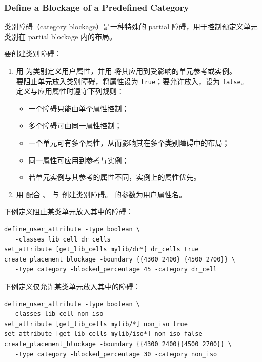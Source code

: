 \subsubsection*{Define a Blockage of a Predefined Category}

类别障碍（category blockage）是一种特殊的 partial 障碍，用于控制预定义单元类别在 partial blockage 内的布局。

要创建类别障碍：
\begin{enumerate}
  \item 用  为类别定义用户属性，并用  将其应用到受影响的单元参考或实例。\\
    要阻止单元放入类别障碍，将属性设为 \texttt{true}；要允许放入，设为 \texttt{false}。\\
    定义与应用属性时遵守下列规则：
    \begin{itemize}
      \item 一个障碍只能由单个属性控制；
      \item 多个障碍可由同一属性控制；
      \item 一个单元可有多个属性，从而影响其在多个类别障碍中的布局；
      \item 同一属性可应用到参考与实例；
      \item 若单元实例与其参考的属性不同，实例上的属性优先。
    \end{itemize}
  \item 用  配合 、 与  创建类别障碍。 的参数为用户属性名。
\end{enumerate}

下例定义阻止某类单元放入其中的障碍：
\begin{lstlisting}
define_user_attribute -type boolean \
   -classes lib_cell dr_cells
set_attribute [get_lib_cells mylib/dr*] dr_cells true
create_placement_blockage -boundary {{4300 2400} {4500 2700}} \
   -type category -blocked_percentage 45 -category dr_cell
\end{lstlisting}

下例定义仅允许某类单元放入其中的障碍：
\begin{lstlisting}
define_user_attribute -type boolean \
  -classes lib_cell non_iso
set_attribute [get_lib_cells mylib/*] non_iso true
set_attribute [get_lib_cells mylib/iso*] non_iso false
create_placement_blockage -boundary {{4300 2400}{4500 2700}} \
   -type category -blocked_percentage 30 -category non_iso
\end{lstlisting}

